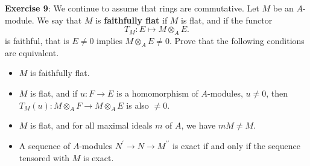 \documentclass{article}
\begin{document}
\textbf{Exercise 9}: We continue to assume that rings are commutative. Let $M$ be an $A$-module. We say that $M$ is \textbf{faithfully flat} if $M$ is flat, and if the functor
    \begin{equation*}
        T_{M}: E \mapsto M\otimes_{A} E.
    \end{equation*}
is faithful, that is $E \neq 0$ implies $M \otimes_{A}E \neq 0$. Prove that the following conditions are equivalent.
    \begin{itemize}
        \item $M$ is faithfully flat.

        \item $M$ is flat, and if $u : F \rightarrow E$ is a homomorphism of $A$-modules, $u \neq 0$, then $T_{M}(u) : M \otimes_{A}F \rightarrow M \otimes_{A}E$ is also $ \neq 0$.

        \item $M$ is flat, and for all maximal ideals $m$ of $A$, we have $mM \neq M$.

        \item A sequence of $A$-modules $N^{\prime}\rightarrow N \rightarrow M^{\prime\prime}$ is exact if and only if the sequence tensored with $M$ is exact.
    \end{itemize}
\end{document}
